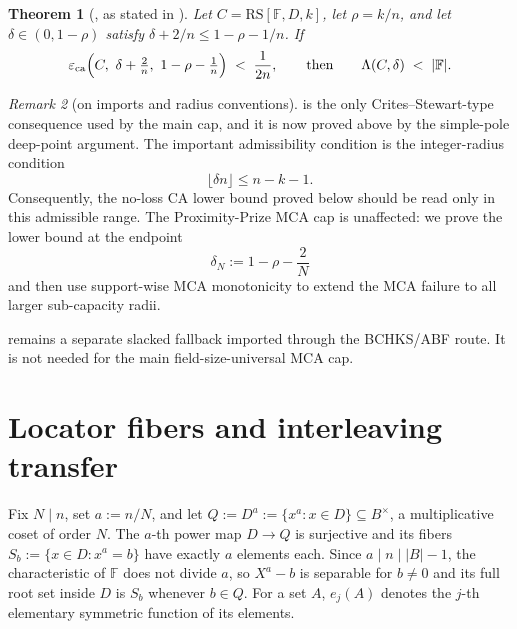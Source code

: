 \documentclass[11pt]{article}
\newtheorem{theorem}{Theorem}[section]
\theoremstyle{definition}
\theoremstyle{remark}
\newtheorem{remark}[theorem]{Remark}
\newcommand{\F}{\mathbb{F}}
\newcommand{\B}{B}
\newcommand{\RS}{\mathrm{RS}}
\newcommand{\eca}{\varepsilon_{\mathrm{ca}}}
\newcommand{\Lst}{\Lambda}
\begin{document}
\begin{theorem}[{\cite[Thm.~1.9]{BCHKS25}}, as stated in {\cite[Thm.~5.2]{ABF26}}]\label{thm:B}
Let $C=\RS[\F,D,k]$, let $\rho=k/n$, and let $\delta\in(0,1-\rho)$ satisfy $\delta+2/n\le 1-\rho-1/n$. If
\[
\eca\Bigl(C,\ \delta+\tfrac2n,\ 1-\rho-\tfrac1n\Bigr)\;<\;\frac1{2n},
\qquad\text{then}\qquad
\Lst(C,\delta)\;<\;|\F| .
\]
\end{theorem}

\begin{remark}[on imports and radius conventions]\label{rem:import}
 is the only Crites--Stewart-type consequence used by the main cap, and it is now proved above by the simple-pole deep-point argument.  The important admissibility condition is the integer-radius condition
\[
        \lfloor \delta n\rfloor \le n-k-1 .
\]
Consequently, the no-loss CA lower bound proved below should be read only in this admissible range. The Proximity-Prize MCA cap is unaffected: we prove the lower bound at the endpoint
\[
        \delta_N:=1-\rho-\frac2N
\]
and then use support-wise MCA monotonicity to extend the MCA failure to all larger sub-capacity radii.

 remains a separate slacked fallback imported through the BCHKS/ABF route. It is not needed for the main field-size-universal MCA cap.
\end{remark}

\section{Locator fibers and interleaving transfer}\label{sec:fiber}

Fix $N\mid n$, set $a:=n/N$, and let $Q:=D^{a}:=\{x^a:x\in D\}\subseteq\B^\times$, a multiplicative coset of order $N$. The $a$-th power map $D\to Q$ is surjective and its fibers $S_b:=\{x\in D:x^a=b\}$ have exactly $a$ elements each. Since $a\mid n\mid|\B|-1$, the characteristic of $\F$ does not divide $a$, so $X^a-b$ is separable for $b\ne0$ and its full root set inside $D$ is $S_b$ whenever $b\in Q$. For a set $A$, $e_j(A)$ denotes the $j$-th elementary symmetric function of its elements.
\end{document}
